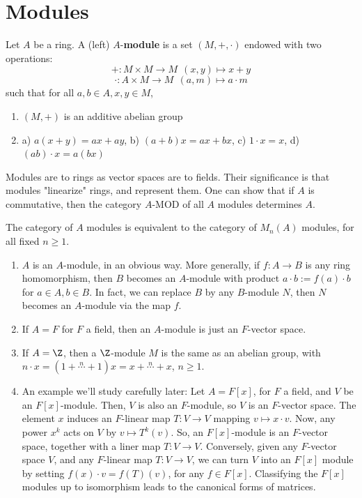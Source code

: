 
\section{Modules}

\begin{defn}
    Let $A$ be a ring. A (left) $A$-\textbf{module} is a set $(M,+,\cdot)$ endowed with two operations:
    $$+:M \times M \to M\:\: (x,y) \mapsto x+y$$
    $$\cdot :A \times M \to M \: \: (a,m) \mapsto a\cdot m$$
    such that for all $a,b \in A,x,y \in M$,
    \begin{enumerate}
        \item[(i)] $(M,+)$ is an additive abelian group
        \item[(ii)] a) $a(x+y)=ax+ay$, b) $(a+b)x = ax+bx$, c) $1\cdot x=x$, d) $(ab)\cdot x=a(bx)$
    \end{enumerate}
\end{defn}

\begin{rmk}
    Modules are to rings as vector spaces are to fields. Their significance is that modules "linearize" rings, and represent them. One can show that if $A$ is commutative, then the category $A$-MOD of all $A$ modules determines $A$.
\end{rmk}

\begin{thm}
    The category of $A$ modules is equivalent to the category of $M_n(A)$ modules, for all fixed $n \ge1$.
\end{thm}

\begin{ex}
    \begin{enumerate}
        \item $A$ is an $A$-module, in an obvious way. More generally, if $f:A \to B$ is any ring homomorphism, then $B$ becomes an $A$-module with product $a \cdot b:=f(a) \cdot b$ for $a\in A,b \in B$. In fact, we can replace $B$ by any $B$-module $N$, then $N$ becomes an $A$-module via the map $f$.
        \item If $A =F$ for $F$ a field, then an $A$-module is just an $F$-vector space.
        \item If $A = \Z$, then a $\Z$-module $M$ is the same as an abelian group, with $n\cdot x = (1+\overset{n}{\cdots}+1)x=x+\overset{n}{\cdots}+x$, $n \geq 1$.
        \item An example we'll study carefully later: Let $A = F[x]$, for $F$ a field, and $V$ be an $F[x]$-module. Then, $V$ is also an $F$-module, so $V$ is an $F$-vector space. The element $x$ induces an $F$-linear map $T:V \to V$ mapping $v \mapsto x\cdot v$. Now, any power $x^k$ acts on $V$ by $v \mapsto T^k(v)$. So, an $F[x]$-module is an $F$-vector space, together with a liner map $T:V \to V$. Conversely, given any $F$-vector space $V$, and any $F$-linear map $T:V \to V$, we can turn $V$ into an $F[x]$ module by setting $f(x) \cdot v= f(T)(v)$, for any $f \in F[x]$. Classifying the $F[x]$ modules up to isomorphism leads to the canonical forms of matrices.
    \end{enumerate}
\end{ex}

